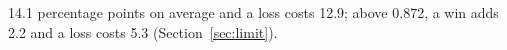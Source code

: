 \begin{itemize}
  14.1 percentage points on average and a loss costs 12.9; above 0.872, a win adds 2.2 and a loss
  costs 5.3 (Section~\ref{sec:limit}).

\end{itemize}
